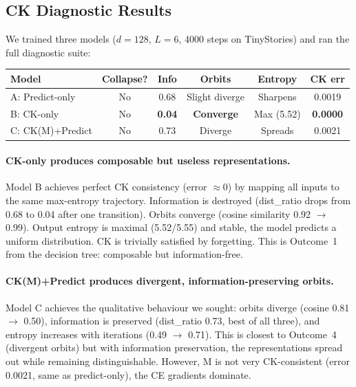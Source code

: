 \documentclass[11pt, a4paper]{article}
\theoremstyle{plain}
\theoremstyle{remark}
\begin{document}
\subsection{CK Diagnostic Results}\label{sec:ck-diagnostics}

We trained three models ($d{=}128$, $L{=}6$, 4000 steps on TinyStories) and ran the full diagnostic suite:

\begin{center}\small
\begin{tabular}{@{}lccccc@{}}
\toprule
\textbf{Model} & \textbf{Collapse?} & \textbf{Info} & \textbf{Orbits} & \textbf{Entropy} & \textbf{CK err} \\
\midrule
A: Predict-only & No & 0.68 & Slight diverge & Sharpens & 0.0019 \\
B: CK-only & No & \textbf{0.04} & \textbf{Converge} & Max (5.52) & \textbf{0.0000} \\
C: CK(M)+Predict & No & 0.73 & Diverge & Spreads & 0.0021 \\
\bottomrule
\end{tabular}
\end{center}

\paragraph{CK-only produces composable but useless representations.}
Model B achieves perfect CK consistency (error ${\approx}0$) by mapping all inputs to the same max-entropy trajectory.
Information is destroyed (dist\_ratio drops from 0.68 to 0.04 after one transition).
Orbits converge (cosine similarity 0.92 $\to$ 0.99).
Output entropy is maximal (5.52/5.55) and stable, the model predicts a uniform distribution.
CK is trivially satisfied by forgetting.
This is Outcome~1 from the decision tree: composable but information-free.

\paragraph{CK(M)+Predict produces divergent, information-preserving orbits.}
Model C achieves the qualitative behaviour we sought: orbits diverge (cosine 0.81 $\to$ 0.50), information is preserved (dist\_ratio 0.73, best of all three), and entropy increases with iterations (0.49 $\to$ 0.71).
This is closest to Outcome~4 (divergent orbits) but with information preservation, the representations spread out while remaining distinguishable.
However, M is not very CK-consistent (error 0.0021, same as predict-only), the CE gradients dominate.
\end{document}
